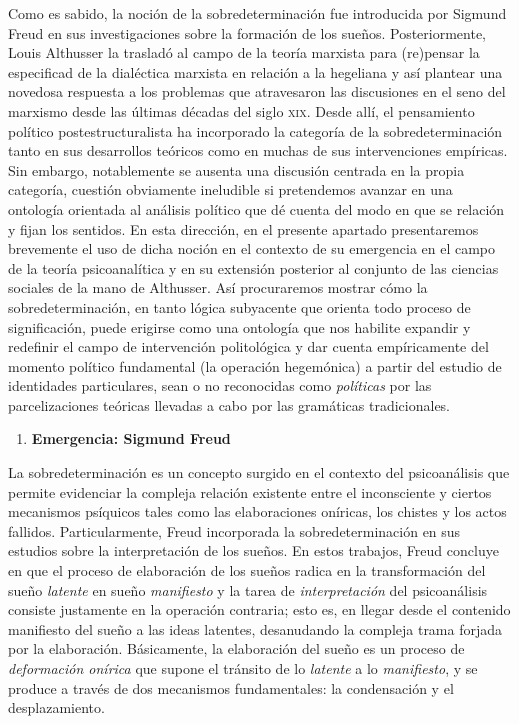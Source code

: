 Como es sabido, la noción de la sobredeterminación fue introducida por Sigmund Freud en sus investigaciones sobre la formación de los sueños. Posteriormente, Louis Althusser la trasladó al campo de la teoría marxista para (re)pensar la especificad de la dialéctica marxista en relación a la hegeliana y así plantear una novedosa respuesta a los problemas que atravesaron las discusiones en el seno del marxismo desde las últimas décadas del siglo \textsc{xix}. Desde allí, el pensamiento político postestructuralista ha incorporado la categoría de la sobredeterminación tanto en sus desarrollos teóricos como en muchas de sus intervenciones empíricas. Sin embargo, notablemente se ausenta una discusión centrada en la propia categoría, cuestión obviamente ineludible si pretendemos avanzar en una ontología orientada al análisis político que dé cuenta del modo en que se relación y fijan los sentidos. En esta dirección, en el presente apartado presentaremos brevemente el uso de dicha noción en el contexto de su emergencia en el campo de la teoría psicoanalítica y en su extensión posterior al conjunto de las ciencias sociales de la mano de Althusser. Así procuraremos mostrar cómo la sobredeterminación, en tanto lógica subyacente que orienta todo proceso de significación, puede erigirse como una ontología que nos habilite expandir y redefinir el campo de intervención politológica y dar cuenta empíricamente del momento político fundamental (la operación hegemónica) a partir del estudio de identidades particulares, sean o no reconocidas como \emph{políticas} por las parcelizaciones teóricas llevadas a cabo por las gramáticas tradicionales.

\begin{enumerate}
\def\labelenumi{\arabic{enumi}.}
\item
  \textbf{Emergencia: Sigmund Freud}
\end{enumerate}

La sobredeterminación es un concepto surgido en el contexto del psicoanálisis que permite evidenciar la compleja relación existente entre el inconsciente y ciertos mecanismos psíquicos tales como las elaboraciones oníricas, los chistes y los actos fallidos. Particularmente, Freud incorporada la sobredeterminación en sus estudios sobre la interpretación de los sueños. En estos trabajos, Freud concluye en que el proceso de elaboración de los sueños radica en la transformación del sueño \emph{latente} en sueño \emph{manifiesto} y la tarea de \emph{interpretación} del psicoanálisis consiste justamente en la operación contraria; esto es, en llegar desde el contenido manifiesto del sueño a las ideas latentes, desanudando la compleja trama forjada por la elaboración. Básicamente, la elaboración del sueño es un proceso de \emph{deformación onírica} que supone el tránsito de lo \emph{latente} a lo \emph{manifiesto}, y se produce a través de dos mecanismos fundamentales: la condensación y el desplazamiento.

